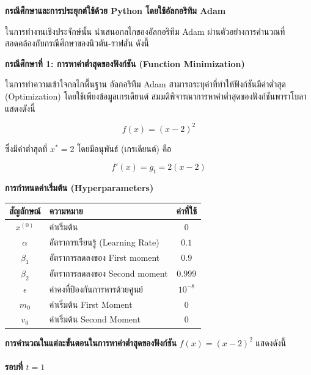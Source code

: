 \textbf{กรณีศึกษาและการประยุกต์ใช้ด้วย Python โดยใช้อัลกอริทึม Adam}

ในการทำงานเชิงประจักษ์นั้น นำเสนอกลไกของอัลกอริทึม Adam ผ่านตัวอย่างการคำนวณที่สอดคล้องกับกรณีศึกษาของนิวตัน-ราฟสัน ดังนี้

\textbf{กรณีศึกษาที่ 1: การหาค่าต่ำสุดของฟังก์ชัน (Function Minimization)}

ในการทำความเข้าใจกลไกพื้นฐาน อัลกอริทึม Adam สามารถระบุค่าที่ทำให้ฟังก์ชันมีค่าต่ำสุด (Optimization) โดยใช้เพียงข้อมูลเกรเดียนต์ สมมติพิจารณาการหาค่าต่ำสุดของฟังก์ชันพาราโบลา แสดงดังนี้

$$f(x) = (x-2)^2$$

ซึ่งมีค่าต่ำสุดที่ $x^* = 2$ โดยมีอนุพันธ์ (เกรเดียนต์) คือ

$$f'(x) = g_t = 2(x-2)$$

\noindent
\textbf{การกำหนดค่าเริ่มต้น (Hyperparameters)}

\begin{center}
\renewcommand{\arraystretch}{1.3}
\begin{tabular}{|c|l|c|}
\hline
\textbf{สัญลักษณ์} & \textbf{ความหมาย} & \textbf{ค่าที่ใช้} \\
\hline
$x^{(0)}$ & ค่าเริ่มต้น & $0$ \\
\hline
$\alpha$ & อัตราการเรียนรู้ (Learning Rate) & $0.1$ \\
\hline
$\beta_1$ & อัตราการลดลงของ First moment & $0.9$ \\
\hline
$\beta_2$ & อัตราการลดลงของ Second moment & $0.999$ \\
\hline
$\epsilon$ & ค่าคงที่ป้องกันการหารด้วยศูนย์ & $10^{-8}$ \\
\hline
$m_0$ & ค่าเริ่มต้น First Moment & $0$ \\
\hline
$v_0$ & ค่าเริ่มต้น Second Moment & $0$ \\
\hline
\end{tabular}
\end{center}

\noindent
\textbf{การคำนวณในแต่ละขั้นตอนในการหาค่าต่ำสุดของฟังก์ชัน} $f(x) = (x-2)^2$ แสดงดังนี้

\paragraph{รอบที่ $t = 1$}

